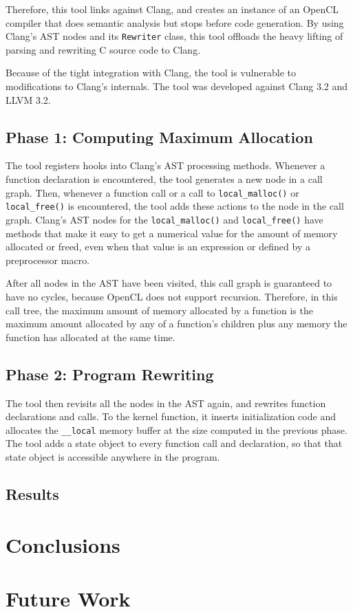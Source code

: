 \documentclass{article}
\begin{document}
Therefore, this tool links against Clang, and creates an instance of an OpenCL compiler that does semantic analysis but stops before code generation. By using Clang's AST nodes and its \texttt{Rewriter} class, this tool offloads the heavy lifting of parsing and rewriting C source code to Clang.

Because of the tight integration with Clang, the tool is vulnerable to modifications to Clang's internals. The tool was developed against Clang 3.2 and LLVM 3.2.

\subsection{Phase 1: Computing Maximum Allocation}
The tool registers hooks into Clang's AST processing methods. Whenever a function declaration is encountered, the tool generates a new node in a call graph. Then, whenever a function call or a call to \texttt{local\_malloc()} or \texttt{local\_free()} is encountered, the tool adds these actions to the node in the call graph. Clang's AST nodes for the \texttt{local\_malloc()} and \texttt{local\_free()} have methods that make it easy to get a numerical value for the amount of memory allocated or freed, even when that value is an expression or defined by a preprocessor macro.

After all nodes in the AST have been visited, this call graph is guaranteed to have no cycles, because OpenCL does not support recursion. Therefore, in this call tree, the maximum amount of memory allocated by a function is the maximum amount allocated by any of a function's children plus any memory the function has allocated at the same time.

\subsection{Phase 2: Program Rewriting}
The tool then revisits all the nodes in the AST again, and rewrites function declarations and calls. To the kernel function, it inserts initialization code and allocates the \texttt{\_\_local} memory buffer at the size computed in the previous phase. The tool adds a state object to every function call and declaration, so that that state object is accessible anywhere in the program.

\subsection{Results}

\section{Conclusions}

\section{Future Work}




\end{document}
